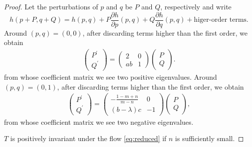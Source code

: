 \documentclass[a4paper,11pt]{article}
\begin{document}
\begin{proof}
Let the perturbations of $p$ and $q$ be $P$ and $Q$, respectively and write 
$$h(p+P,q+Q) = h(p,q) + P\frac{\partial h}{\partial p}(p,q) + Q\frac{\partial h}{\partial q}(p,q) + \text{higer-order terms}.$$
Around $(p,q) = (0,0)$, after discarding  terms higher than the first order, we obtain
\begin{align*}
 \begin{pmatrix} {P}^\prime\\ {Q}^\prime \end{pmatrix} =
 \begin{pmatrix} 2 & 0 \\  ab & 1 \end{pmatrix} \begin{pmatrix} {P}\\ {Q} \end{pmatrix}.
\end{align*}
from whose coefficient matrix we see two positive eigenvalues. Around $(p,q) = (0,1)$, after discarding  terms higher than the first order, we obtain
\begin{align*}
 \begin{pmatrix} {P}^\prime\\ {Q}^\prime \end{pmatrix} =
 \begin{pmatrix} -\frac{1-m+n}{m-n} & 0 \\  (b- \lambda)c & -1 \end{pmatrix} \begin{pmatrix} {P}\\ {Q} \end{pmatrix},
\end{align*}
from whose coefficient matrix we see two negative eigenvalues. %

\medskip {} 
 $T$ is positively invariant under the flow \eqref{eq:reduced} if $n$ is sufficiently small.
\medskip


\end{proof}
\end{document}

